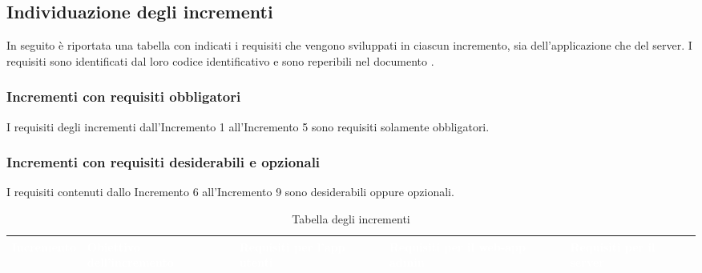 \subsection{Individuazione degli incrementi}
In seguito è riportata una tabella con indicati i requisiti che vengono sviluppati in ciascun incremento, sia dell'applicazione che del server.
I requisiti sono identificati dal loro codice identificativo e sono reperibili nel documento \AdR{}.\\
\subsubsection{Incrementi con requisiti obbligatori}
I requisiti degli incrementi dall'Incremento 1 all'Incremento 5 sono requisiti solamente obbligatori.
\subsubsection{Incrementi con requisiti desiderabili e opzionali}
I requisiti contenuti dallo Incremento 6 all'Incremento 9 sono desiderabili oppure opzionali. 

{
\renewcommand{\arraystretch}{2}
\centering
	
\begin{longtable}{C{2.5cm} C{3.2cm} C{2.8cm} C{2.8cm} C{2.8cm}}
\caption{Tabella degli incrementi}\\
\textcolor{white}{\textbf{Incremento}} &
\textcolor{white}{\textbf{Obiettivo dell'incremento}} & 
\textcolor{white}{\textbf{Requisiti per l'app utenti}} &
\textcolor{white}{\textbf{Requisiti per il web-app admin}} &
\textcolor{white}{\textbf{Requisiti per il server}} \\
\endhead





















\end{longtable}
}